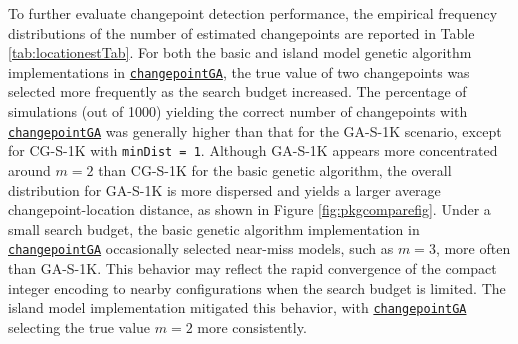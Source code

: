 To further evaluate changepoint detection performance, the empirical frequency distributions of the number of estimated changepoints are reported in Table \ref{tab:locationestTab}. For both the basic and island model genetic algorithm implementations in \href{https://CRAN.R-project.org/package=changepointGA}{\texttt{changepointGA}}, the true value of two changepoints was selected more frequently as the search budget increased. The percentage of simulations (out of 1000) yielding the correct number of changepoints with \href{https://CRAN.R-project.org/package=changepointGA}{\texttt{changepointGA}} was generally higher than that for the GA-S-1K scenario, except for CG-S-1K with \texttt{minDist\ =\ 1}. Although GA-S-1K appears more concentrated around \(m = 2\) than CG-S-1K for the basic genetic algorithm, the overall distribution for GA-S-1K is more dispersed and yields a larger average changepoint-location distance, as shown in Figure \ref{fig:pkgcomparefig}. Under a small search budget, the basic genetic algorithm implementation in \href{https://CRAN.R-project.org/package=changepointGA}{\texttt{changepointGA}} occasionally selected near-miss models, such as \(m = 3\), more often than GA-S-1K. This behavior may reflect the rapid convergence of the compact integer encoding to nearby configurations when the search budget is limited. The island model implementation mitigated this behavior, with \href{https://CRAN.R-project.org/package=changepointGA}{\texttt{changepointGA}} selecting the true value \(m = 2\) more consistently.

